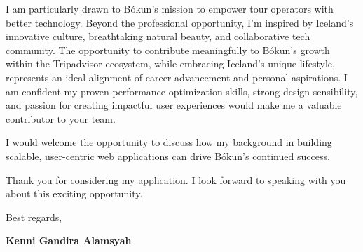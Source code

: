 \documentclass[11pt]{article}
\begin{document}
I am particularly drawn to Bókun's mission to empower tour operators with better technology. Beyond the professional opportunity, I'm inspired by Iceland's innovative culture, breathtaking natural beauty, and collaborative tech community. The opportunity to contribute meaningfully to Bókun's growth within the Tripadvisor ecosystem, while embracing Iceland's unique lifestyle, represents an ideal alignment of career advancement and personal aspirations. I am confident my proven performance optimization skills, strong design sensibility, and passion for creating impactful user experiences would make me a valuable contributor to your team.

I would welcome the opportunity to discuss how my background in building scalable, user-centric web applications can drive Bókun's continued success.

Thank you for considering my application. I look forward to speaking with you about this exciting opportunity.

\vspace{1em}

Best regards,

\textbf{Kenni Gandira Alamsyah}
\end{document}
